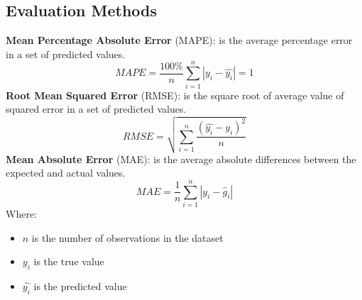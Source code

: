 \documentclass{ieeeojies}
\begin{document}
\subsection{Evaluation Methods}
\textbf{Mean Percentage Absolute Error} (MAPE): is the average percentage error in a set of predicted values\cite{Eval}.\\
\begin{equation*}
    MAPE=\frac{100\%}{n}  \sum_{i=1}^{n} |y_i-\hat{y_i} |  = 1 
\end{equation*}
\textbf{Root Mean Squared Error} (RMSE): is the square root of average value of squared error in a set of predicted values\cite{Eval}.
\begin{equation*}
    RMSE=\sqrt{\sum_{i=1}^{n} \frac{(\hat{y_i}-y_i )^2}{n} }
\end{equation*}
\textbf{Mean Absolute Error} (MAE): is the average absolute differences between the expected and actual values\cite{Eval}.
\begin{equation*}
    MAE= \frac{1}{n}\sum_{i=1}^{n}|y_i - \hat{g}_i|
\end{equation*}
Where:
\begin{itemize}
    \item \(n\) is the number of observations in the dataset
    \item \(y_i\)  is the true value
    \item \(\hat{y_i}\) is the predicted value
\end{itemize}
\end{document}
